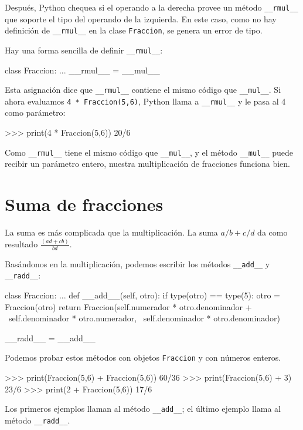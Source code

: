Después, Python chequea si el operando a la derecha provee un método
\texttt{\_\_rmul\_\_} que soporte el tipo del operando de la izquierda.
En este caso, como no hay definición de \texttt{\_\_rmul\_\_} en la
clase \texttt{Fraccion}, se genera un error de tipo.

Hay una forma sencilla de definir \texttt{\_\_rmul\_\_}:
\begin{pythoncode}
class Fraccion:
  ...
  __rmul__ = __mul__
\end{pythoncode}
 Esta asignación dice que \texttt{\_\_rmul\_\_} contiene el mismo
código que \texttt{\_\_mul\_\_}. Si ahora evaluamos \texttt{4 {*}
Fraccion(5,6)}, Python llama a \texttt{\_\_rmul\_\_} y le pasa al
4 como parámetro:

\begin{pyconcode}
>>> print(4 * Fraccion(5,6))
20/6
\end{pyconcode}
 Como \texttt{\_\_rmul\_\_} tiene el mismo código que \texttt{\_\_mul\_\_},
y el método \texttt{\_\_mul\_\_} puede recibir un parámetro entero,
nuestra multiplicación de fracciones funciona bien.

\section{Suma de fracciones}

 

La suma es más complicada que la multiplicación. La suma $a/b+c/d$
da como resultado $\frac{(ad+cb)}{bd}$.

Basándonos en la multiplicación, podemos escribir los métodos \texttt{\_\_add\_\_}
y \texttt{\_\_radd\_\_}:

\begin{pythoncode}
class Fraccion:
  ...
  def __add__(self, otro):
    if type(otro) == type(5):
      otro = Fraccion(otro)
    return Fraccion(self.numerador   * otro.denominador + \
                    self.denominador * otro.numerador,    \
                    self.denominador * otro.denominador) 

  __radd__ = __add__
\end{pythoncode}
 Podemos probar estos métodos con objetos \texttt{Fraccion} y con
números enteros.

\begin{pyconcode}
>>> print(Fraccion(5,6) + Fraccion(5,6))
60/36
>>> print(Fraccion(5,6) + 3)
23/6
>>> print(2 + Fraccion(5,6))
17/6
\end{pyconcode}
 Los primeros ejemplos llaman al método \texttt{\_\_add\_\_}; el último
ejemplo llama al método \texttt{\_\_radd\_\_}.

